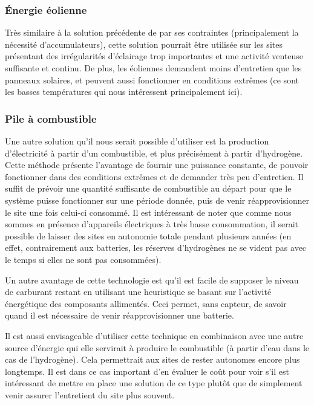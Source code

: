 \subsubsection{Énergie éolienne}

Très similaire à la solution précédente de par ses contraintes (principalement la nécessité d'accumulateurs), cette solution pourrait être utilisée sur les sites présentant des irrégularités d'éclairage trop importantes et une activité venteuse suffisante et continu. De plus, les éoliennes demandent moins d'entretien que les panneaux solaires, et peuvent aussi fonctionner en conditions extrêmes (ce sont les basses températures qui nous intéressent principalement ici).

\subsubsection{Pile à combustible}

Une autre solution qu'il nous serait possible d'utiliser est la production d'électricité à partir d'un combustible, et plus précisément à partir d'hydrogène. Cette méthode présente l'avantage de fournir une puissance constante, de pouvoir fonctionner dans des conditions extrêmes et de demander très peu d'entretien. Il suffit de prévoir une quantité suffisante de combustible au départ pour que le système puisse fonctionner sur une période donnée, puis de venir réapprovisionner le site une fois celui-ci consommé. Il est intéressant de noter que comme nous sommes en présence d'appareils électriques à très basse consommation, il serait possible de laisser des sites en autonomie totale pendant plusieurs années (en effet, contrairement aux batteries, les réserves d'hydrogènes ne se vident pas avec le temps si elles ne sont pas consommées).

Un autre avantage de cette technologie est qu'il est facile de supposer le niveau de carburant restant en utilisant une heuristique se basant sur l'activité énergétique des composants allimentés. Ceci permet, sans capteur, de savoir quand il est nécessaire de venir réapprovisionner une batterie.

Il est aussi envisageable d'utiliser cette technique en combinaison avec une autre source d'énergie qui elle servirait à produire le combustible (à partir d'eau dans le cas de l'hydrogène). Cela permettrait aux sites de rester autonomes encore plus longtemps. Il est dans ce cas important d'en évaluer le coût pour voir s'il est intéressant de mettre en place une solution de ce type plutôt que de simplement venir assurer l'entretient du site plus souvent.

